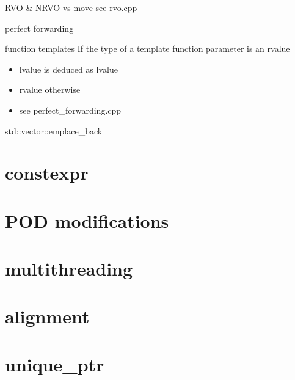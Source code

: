 \documentclass{beamer}
\begin{document}
\begin{frame}{RVO & NRVO vs move}
  see rvo.cpp
\end{frame}

\begin{frame}{perfect forwarding}
  \begin{block}{function templates}
    If the type of a template function parameter is an rvalue
    \begin{itemize}
    \item lvalue is deduced as lvalue
    \item rvalue otherwise
    \item see perfect\_forwarding.cpp
    \end{itemize}
  \end{block}
\end{frame}

\begin{frame}{std::vector::emplace\_back}

\end{frame}


\section{constexpr}
\section{POD modifications}
\section{multithreading}
\section{alignment}
\section{unique\_ptr}
\end{document}
